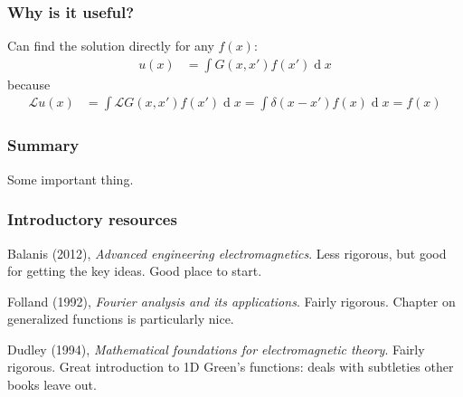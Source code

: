 \documentclass[12 pt, compress, handout, intlimits]{beamer}
\renewcommand{\d}[1]{\ensuremath{\operatorname{d}}\!{#1}}
\renewcommand{\L}{\mathcal{L}}
\begin{document}
\begin{frame}[fragile]
    \frametitle{Why is it useful?}

    Can find the solution directly for any $ f(x) $:
    \begin{align*}
        u(x) &= \int G(x,x') f(x') \d x
    \end{align*}
    because
    \begin{align*}
        \L u(x) &= \int \L G(x,x') f(x') \d x = \int \delta(x - x') f(x) \d x = f(x)
    \end{align*}
    

    
\end{frame}


\begin{frame}[fragile]
    \frametitle{Summary}
    \begin{center}
    Some important thing.
    \end{center}
\end{frame}


\begin{frame}[fragile]
    \frametitle{Introductory resources}
    Balanis (2012), \emph{Advanced engineering electromagnetics}. 
    Less rigorous, but good for getting the key ideas. Good place to start.

    Folland (1992), \emph{Fourier analysis and its applications}. 
    Fairly rigorous.
    Chapter on generalized functions is particularly nice.

    Dudley (1994), \emph{Mathematical foundations for electromagnetic theory}.
    Fairly rigorous. 
    Great introduction to 1D Green's functions: deals with subtleties other books leave out.
    
\end{frame}    

\note{}
\end{document}
